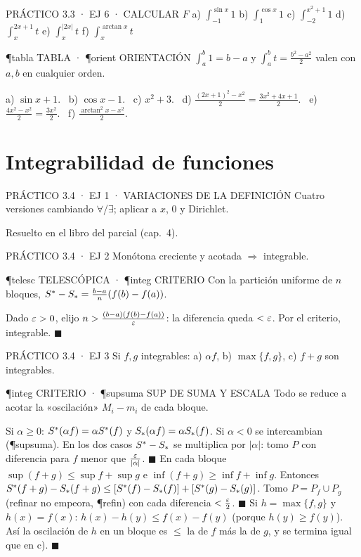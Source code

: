 \begin{enunciado}{PRÁCTICO 3.3 · EJ 6 · CALCULAR $F$}
a) $\int_{-1}^{\sin x}1$ b) $\int_1^{\cos x}1$ c) $\int_{-2}^{x^2+1}1$ d) $\int_x^{2x+1}t$ e) $\int_x^{|2x|}t$ f) $\int_x^{\arctan x}t$
\end{enunciado}
\begin{uso}{\P{tabla} TABLA · \P{orient} ORIENTACIÓN}
$\int_a^b1=b-a$ y $\int_a^bt=\frac{b^2-a^2}2$ valen con $a,b$ en cualquier orden.
\end{uso}
a) $\sin x+1$. \ b) $\cos x-1$. \ c) $x^2+3$. \ d) $\frac{(2x+1)^2-x^2}2=\frac{3x^2+4x+1}2$. \ e) $\frac{4x^2-x^2}2=\frac{3x^2}2$. \ f) $\frac{\arctan^2x-x^2}2$.

\section{Integrabilidad de funciones}

\begin{enunciado}{PRÁCTICO 3.4 · EJ 1 · VARIACIONES DE LA DEFINICIÓN}
Cuatro versiones cambiando $\forall$/$\exists$; aplicar a $x$, $0$ y Dirichlet.
\end{enunciado}
Resuelto en el libro del parcial (cap.\ 4).

\begin{enunciado}{PRÁCTICO 3.4 · EJ 2}
Monótona creciente y acotada $\Rightarrow$ integrable.
\end{enunciado}
\begin{uso}{\P{telesc} TELESCÓPICA · \P{integ} CRITERIO}
Con la partición uniforme de $n$ bloques, $S^{*}-S_{*}=\frac{b-a}n(f(b)-f(a))$.
\end{uso}
Dado $\varepsilon>0$, elijo $n>\frac{(b-a)(f(b)-f(a))}{\varepsilon}$: la diferencia queda $<\varepsilon$. Por el criterio, integrable. $\blacksquare$

\begin{enunciado}{PRÁCTICO 3.4 · EJ 3}
Si $f,g$ integrables: a) $\alpha f$, b) $\max\{f,g\}$, c) $f+g$ son integrables.
\end{enunciado}
\begin{uso}{\P{integ} CRITERIO · \P{supsuma} SUP DE SUMA Y ESCALA}
Todo se reduce a acotar la «oscilación» $M_i-m_i$ de cada bloque.
\end{uso}
Si $\alpha\ge0$: $S^{*}(\alpha f)=\alpha S^{*}(f)$ y $S_{*}(\alpha f)=\alpha S_{*}(f)$. Si $\alpha<0$ se intercambian (\P{supsuma}). En los dos casos $S^{*}-S_{*}$ se multiplica por $|\alpha|$: tomo $P$ con diferencia para $f$ menor que $\frac{\varepsilon}{|\alpha|}$. $\blacksquare$
En cada bloque $\sup(f+g)\le\sup f+\sup g$ e $\inf(f+g)\ge\inf f+\inf g$. Entonces $S^{*}(f+g)-S_{*}(f+g)\le[S^{*}(f)-S_{*}(f)]+[S^{*}(g)-S_{*}(g)]$. Tomo $P=P_f\cup P_g$ (refinar no empeora, \P{refin}) con cada diferencia $<\frac{\varepsilon}2$. $\blacksquare$
Si $h=\max\{f,g\}$ y $h(x)=f(x)$: $h(x)-h(y)\le f(x)-f(y)$ (porque $h(y)\ge f(y)$). Así la oscilación de $h$ en un bloque es $\le$ la de $f$ más la de $g$, y se termina igual que en c). $\blacksquare$

